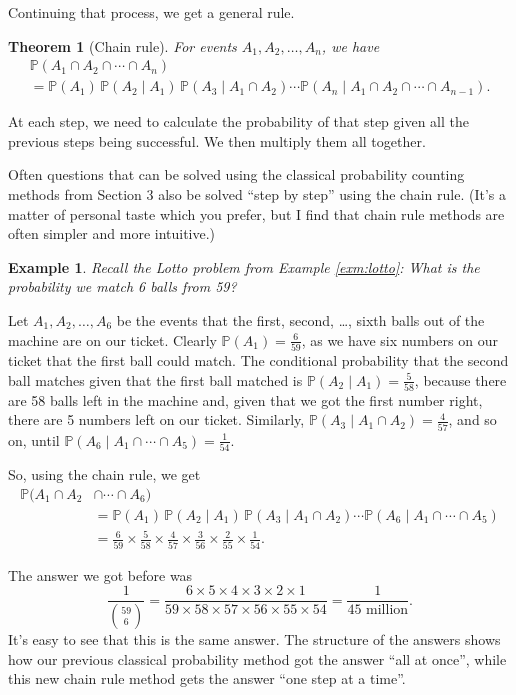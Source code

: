 \documentclass[
  a4paper,
]{book}
\newtheorem{theorem}{Theorem}[chapter]
\theoremstyle{definition}
\theoremstyle{definition}
\newtheorem{example}{Example}[chapter]
\theoremstyle{definition}
\theoremstyle{definition}
\theoremstyle{remark}
\begin{document}
Continuing that process, we get a general rule.

\begin{theorem}[Chain rule]
\protect\hypertarget{thm:thchain}{}\label{thm:thchain}For events \(A_1, A_2, \dots, A_n\), we have
\begin{multline*}  \mathbb P(A_1 \cap A_2 \cap \cdots \cap A_n) \\
  = \mathbb P(A_1) \, \mathbb P(A_2 \mid A_1) \, \mathbb P(A_3 \mid A_1 \cap A_2) \cdots \mathbb P(A_n \mid A_1 \cap A_2 \cap \cdots \cap  A_{n-1}) .\end{multline*}
\end{theorem}

At each step, we need to calculate the probability of that step given all the previous steps being successful. We then multiply them all together.

Often questions that can be solved using the classical probability counting methods from Section 3 also be solved ``step by step'' using the chain rule. (It's a matter of personal taste which you prefer, but I find that chain rule methods are often simpler and more intuitive.)

\begin{example}
\emph{Recall the Lotto problem from Example \ref{exm:lotto}: What is the probability we match 6 balls from 59?}

Let \(A_1, A_2, \dots, A_6\) be the events that the first, second, \ldots, sixth balls out of the machine are on our ticket. Clearly \(\mathbb P(A_1) = \frac{6}{59}\), as we have six numbers on our ticket that the first ball could match. The conditional probability that the second ball matches given that the first ball matched is \(\mathbb P(A_2 \mid A_1) = \frac{5}{58}\), because there are 58 balls left in the machine and, given that we got the first number right, there are 5 numbers left on our ticket. Similarly, \(\mathbb P(A_3 \mid A_1 \cap A_2) = \frac{4}{57}\), and so on, until \(\mathbb P(A_6 \mid A_1 \cap \cdots\cap A_5) = \frac{1}{54}\).

So, using the chain rule, we get
\begin{align*}
\mathbb P(A_1 \cap A_2 &\cap \cdots \cap A_6) \\
&= \mathbb P(A_1) \, \mathbb P(A_2 \mid A_1) \, \mathbb P(A_3 \mid A_1 \cap A_2) \cdots \mathbb P(A_6 \mid A_1 \cap \cdots \cap A_5) \\
&= \frac{6}{59} \times \frac{5}{58} \times \frac{4}{57} \times \frac{3}{56} \times \frac{2}{55} \times \frac{1}{54} .
\end{align*}

The answer we got before was
\[ \frac{1}{\binom{59}{6}} = \frac{6 \times 5 \times 4 \times 3 \times 2 \times 1}{59 \times 58 \times 57 \times 56 \times 55 \times 54} = \frac{1}{45 \text{ million}} . \]
It's easy to see that this is the same answer. The structure of the answers shows how our previous classical probability method got the answer ``all at once'', while this new chain rule method gets the answer ``one step at a time''.
\end{example}
\end{document}
